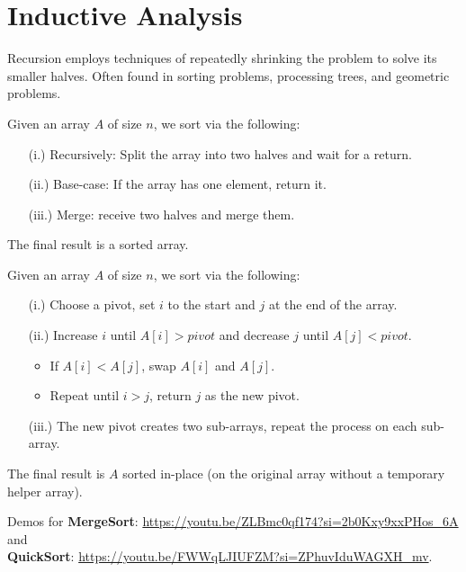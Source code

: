 \vspace{-2em}
\section{Inductive Analysis}

Recursion employs techniques of repeatedly shrinking the problem to solve its smaller halves. Often found in sorting problems, processing trees, and
geometric problems.

\begin{theo}[MergeSort]
    
    Given an array $A$ of size $n$, we sort via the following:
    \begin{enumerate}
        \item [(i.)] Recursively: Split the array into two halves and wait for a return.
        \item [(ii.)] Base-case: If the array has one element, return it.
        \item [(iii.)] Merge: receive two halves and merge them.
    \end{enumerate}
    The final result is a sorted array.
\end{theo}

\begin{theo}[QuickSort]

    Given an array $A$ of size $n$, we sort via the following:
    \begin{enumerate}
        \item [(i.)] Choose a pivot, set $i$ to the start and $j$ at the end of the array.
        \item [(ii.)] Increase $i$ until $A[i]>pivot$ and decrease $j$ until $A[j]<pivot$.
        \begin{itemize}
            \item If $A[i]<A[j]$, swap $A[i]$ and $A[j]$.
            \item Repeat until $i>j$, return $j$ as the new pivot.
        \end{itemize}
        \item [(iii.)] The new pivot creates two sub-arrays, repeat the process on each sub-array.
    \end{enumerate}
    The final result is $A$ sorted in-place (on the original array without a temporary helper array).
\end{theo}

\begin{Tip} Demos for 
 \textbf{MergeSort}: \url{https://youtu.be/ZLBmc0qf174?si=2b0Kxy9xxPHos_6A} and\\
 \textbf{QuickSort}: \url{https://youtu.be/FWWqLJIUFZM?si=ZPhuvIduWAGXH_mv}.
\end{Tip}

